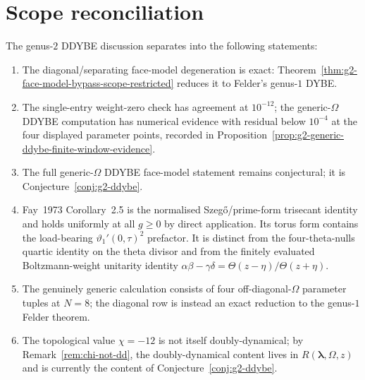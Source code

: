 \section{Scope reconciliation}
\label{sec:g2-corrigenda}

\begin{remark}
\label{rem:g2-corrigenda}
The genus-$2$ DDYBE discussion separates into the following statements:
\begin{enumerate}[label=\textup{(\alph*)}]
\item The diagonal/separating face-model degeneration is exact:
 Theorem~\ref{thm:g2-face-model-bypass-scope-restricted}
 reduces it to Felder's genus-$1$ DYBE.
\item The single-entry weight-zero check has agreement at
 $10^{-12}$; the generic-$\Omega$ DDYBE computation has numerical
 evidence with residual below $10^{-4}$ at the four displayed
 parameter points, recorded in
 Proposition~\ref{prop:g2-generic-ddybe-finite-window-evidence}.
\item The full generic-$\Omega$ DDYBE face-model statement remains
 conjectural; it is Conjecture~\ref{conj:g2-ddybe}.
\item Fay~1973 Corollary~2.5 is the normalised
 Szeg\H{o}/prime-form trisecant identity and holds uniformly at
 all $g\ge 0$ by direct application. Its torus form contains the
 load-bearing $\vartheta_1'(0,\tau)^2$ prefactor. It is distinct
 from the four-theta-nulls quartic identity on the theta divisor
 and from the finitely evaluated Boltzmann-weight unitarity
 identity
 $\alpha\beta-\gamma\delta = \Theta(z-\eta)/\Theta(z+\eta)$.
\item The genuinely generic calculation consists of four
 off-diagonal-$\Omega$ parameter tuples at $N=8$; the diagonal row is
 instead an exact reduction to the genus-$1$ Felder theorem.
\item The topological value $\chi=-12$ is not itself
 doubly-dynamical; by Remark~\ref{rem:chi-not-dd}, the
 doubly-dynamical content lives in
 $R(\boldsymbol\lambda,\Omega,z)$ and is currently the content of
 Conjecture~\ref{conj:g2-ddybe}.
\end{enumerate}
\end{remark}

